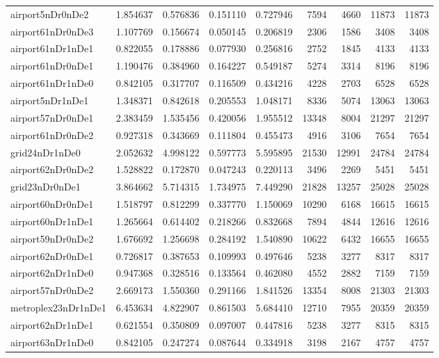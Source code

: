\begin{longtable}{|l|r|r|r|r|r|r|r|r|}
airport5nDr0nDe2 & 1.854637 & 0.576836 & 0.151110 & 0.727946 & 7594 & 4660 & 11873 & 11873 \\
airport61nDr0nDe3 & 1.107769 & 0.156674 & 0.050145 & 0.206819 & 2306 & 1586 & 3408 & 3408 \\
airport61nDr1nDe1 & 0.822055 & 0.178886 & 0.077930 & 0.256816 & 2752 & 1845 & 4133 & 4133 \\
airport61nDr0nDe1 & 1.190476 & 0.384960 & 0.164227 & 0.549187 & 5274 & 3314 & 8196 & 8196 \\
airport61nDr1nDe0 & 0.842105 & 0.317707 & 0.116509 & 0.434216 & 4228 & 2703 & 6528 & 6528 \\
airport5nDr1nDe1 & 1.348371 & 0.842618 & 0.205553 & 1.048171 & 8336 & 5074 & 13063 & 13063 \\
airport57nDr0nDe1 & 2.383459 & 1.535456 & 0.420056 & 1.955512 & 13348 & 8004 & 21297 & 21297 \\
airport61nDr0nDe2 & 0.927318 & 0.343669 & 0.111804 & 0.455473 & 4916 & 3106 & 7654 & 7654 \\
grid24nDr1nDe0 & 2.052632 & 4.998122 & 0.597773 & 5.595895 & 21530 & 12991 & 24784 & 24784 \\
airport62nDr0nDe2 & 1.528822 & 0.172870 & 0.047243 & 0.220113 & 3496 & 2269 & 5451 & 5451 \\
grid23nDr0nDe1 & 3.864662 & 5.714315 & 1.734975 & 7.449290 & 21828 & 13257 & 25028 & 25028 \\
airport60nDr0nDe1 & 1.518797 & 0.812299 & 0.337770 & 1.150069 & 10290 & 6168 & 16615 & 16615 \\
airport60nDr1nDe1 & 1.265664 & 0.614402 & 0.218266 & 0.832668 & 7894 & 4844 & 12616 & 12616 \\
airport59nDr0nDe2 & 1.676692 & 1.256698 & 0.284192 & 1.540890 & 10622 & 6432 & 16655 & 16655 \\
airport62nDr0nDe1 & 0.726817 & 0.387653 & 0.109993 & 0.497646 & 5238 & 3277 & 8317 & 8317 \\
airport62nDr1nDe0 & 0.947368 & 0.328516 & 0.133564 & 0.462080 & 4552 & 2882 & 7159 & 7159 \\
airport57nDr0nDe2 & 2.669173 & 1.550360 & 0.291166 & 1.841526 & 13354 & 8008 & 21303 & 21303 \\
metroplex23nDr1nDe1 & 6.453634 & 4.822907 & 0.861503 & 5.684410 & 12710 & 7955 & 20359 & 20359 \\
airport62nDr1nDe1 & 0.621554 & 0.350809 & 0.097007 & 0.447816 & 5238 & 3277 & 8315 & 8315 \\
airport63nDr1nDe0 & 0.842105 & 0.247274 & 0.087644 & 0.334918 & 3198 & 2167 & 4757 & 4757 \\

\end{longtable}
